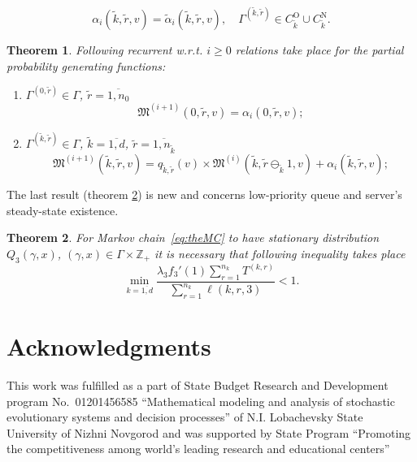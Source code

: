 \documentclass[60x84/16,10pt]{dccn}
\newtheorem{thm}{Theorem}
\begin{document}
{\begin{multline*}
\end{multline*}
\begin{equation*}
\alpha_i(\tilde{k},\tilde{r},v) =\tilde{\alpha}_i(\tilde{k},\tilde{r},v), \quad \Gamma^{(\tilde{k}, \tilde{r})} \in C_{\tilde{k}}^{\mathrm{O}} \cup C_{\tilde{k}}^{\mathrm{N}}.
\end{equation*}
\begin{thm}
Following recurrent w.r.t. $i
\geqslant 0$ relations take place for the  partial probability generating functions:
\begin{enumerate}
\item $\Gamma^{(0,\tilde{r})} \in \Gamma$, $\tilde{r} = \overline{1,n_0}$ 
$$
\mathfrak{M}^{(i+1)}(0,\tilde{r},v) = \alpha_i(0,\tilde{r},v);
$$
\item $\Gamma^{(\tilde{k},\tilde{r})} \in \Gamma $, $\tilde{k} =\overline{1,d}$, $\tilde{r}=\overline{1,n_{\tilde{k}}}$
$$
\mathfrak{M}^{(i+1)}(\tilde{k},\tilde{r},v) = q_{\tilde{k},\tilde{r}} (v)\times  \mathfrak{M}^{(i)}(\tilde{k},\tilde{r} \ominus_{\tilde{k}} 1,v) + \alpha_i(\tilde{k},\tilde{r},v);
$$
\end{enumerate}
\label{theorem:gen}
\end{thm}


The last result (theorem \ref{theorem:nec}) is new and concerns low-priority queue and server's steady-state existence.
\begin{thm}
For Markov chain~\eqref{eq:theMC} to have stationary distribution $Q_3(\gamma,x)$, $(\gamma,x)\in \Gamma \times {\mathbb Z}_+$ it is necessary that  following inequality takes place
$$
\min_{k=\overline{1,d}} { \frac{\lambda_3 f_3'(1) \sum_{r = 1}^{n_k} T^{(k,r)}}  {\sum_{r = 1}^{n_{k}}\ell(k,r,3)}} <1.
$$
\label{theorem:nec}
\end{thm}
\section{Acknowledgments}
This work was fulfilled as a part of State Budget Research and Development program No.~01201456585
``Mathematical modeling and analysis of stochastic evolutionary systems and decision processes'' of
N.I. Lobachevsky State University of Nizhni Novgorod and was supported by State Program ``Promoting
the competitiveness among world's leading research and educational centers''


}
\end{document}
